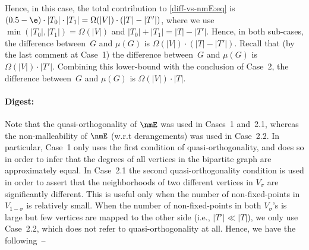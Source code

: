 %
%
Hence, in this case,
the total contribution to \eqref{diff-vs-nmE:eq} is
$(0.5-\e)\cdot|T_0|\cdot|T_1|=\Omega(|V|)\cdot(|T|-|T'|)$,
where we use $\min(|T_0|,|T_1|)=\Omega(|V|)$
and $|T_0|+|T_1|=|T|-|T'|$.
\EDes
Hence, in both sub-cases, the difference between~$G$ and $\mu(G)$
is $\Omega(|V|)\cdot(|T|-|T'|)$.
\EDes
Recall that (by the last comment at Case~1)
the difference between~$G$ and $\mu(G)$
is $\Omega(|V|)\cdot|T'|$.
Combining this lower-bound with the conclusion of Case~2,
the difference between~$G$ and $\mu(G)$ is $\Omega(|V|)\cdot|T|$.
\EPF


\paragraph{Digest:}
Note that the quasi-orthogonality of $\nmE$ was used in Cases~1 and~2.1,
whereas the non-malleability of $\nmE$ (w.r.t derangements)
was used in Case~2.2. In particular, Case~1 only uses the
first condition of quasi-orthogonality, and does so in order to infer
that the degrees of all vertices in the bipartite graph
are approximately equal.
In Case~2.1 the second quasi-orthogonality condition
is used in order to assert that the neighborhoods of two
different vertices in $V_\sigma$ are significantly different.
This is useful only when the number of non-fixed-points in $V_{1-\sigma}$
is relatively small.
When the number of non-fixed-points in both $V_\sigma$'s is large
but few vertices are mapped to the other side (i.e., $|T'|\ll|T|$),
%
we only use Case~2.2, which does not refer to quasi-orthogonality at all.
Hence, we have the following~--


